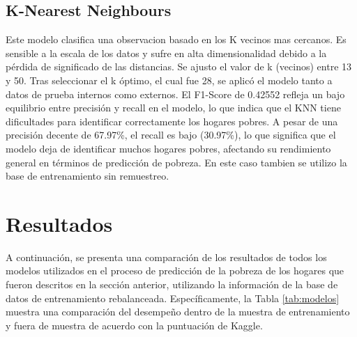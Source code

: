 \documentclass[a4paper]{article}
\theoremstyle{remark}
\theoremstyle{definition}
\begin{document}
\subsection{K-Nearest Neighbours}

Este modelo clasifica una observacion basado en los K vecinos mas cercanos. Es sensible a la escala de los datos y sufre en alta dimensionalidad debido a la pérdida de significado de las distancias. Se ajusto el valor de k (vecinos) entre 13 y 50. Tras seleccionar el k óptimo, el cual fue 28, se aplicó el modelo tanto a datos de prueba internos como externos. El F1-Score de 0.42552 refleja un bajo equilibrio entre precisión y recall en el modelo, lo que indica que el KNN tiene dificultades para identificar correctamente los hogares pobres. A pesar de una precisión decente de 67.97\%, el recall es bajo (30.97\%), lo que significa que el modelo deja de identificar muchos hogares pobres, afectando su rendimiento general en términos de predicción de pobreza. En este caso tambien se utilizo la base de entrenamiento sin remuestreo.




\section{Resultados}

A continuación, se presenta una comparación de los resultados de todos los modelos utilizados en el proceso de predicción de la pobreza de los hogares que fueron descritos en la sección anterior, utilizando la información de la base de datos de entrenamiento rebalanceada. Específicamente, la Tabla \ref{tab:modelos} muestra una comparación del desempeño dentro de la muestra de entrenamiento y fuera de muestra de acuerdo con la puntuación de Kaggle.\\
\end{document}

